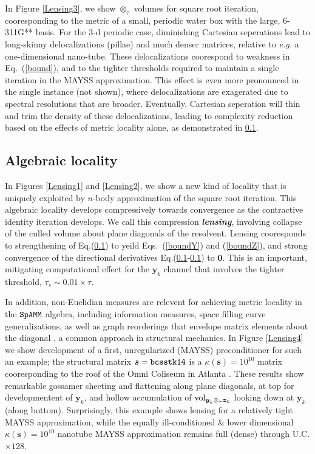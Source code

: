 \documentclass[letterpaper,twocolumn,amsmath,amsfont,amssymb,english,aps,jcp,preprintnumbers,groupaddress,nofootinbib,tightenlines,floatfix]{revtex4}
\newcommand{\mat}[1]{\boldsymbol{#1}}
\newcommand{\ot}{  {\scriptstyle \otimes}_{ \tau } }
\theoremstyle{plain}
\theoremstyle{remark}
\theoremstyle{plain}
\begin{document}
In Figure \ref{Lensing3}, we show $\ot$ volumes for square root iteration, cooresponding to the metric of a small, periodic water box 
with the large, 6-311G** basis.  For the 3-d periodic case, diminishing Cartesian seperations lead to long-skinny delocalizations (pillae)
and much denser matrices, relative to {\em e.g.} a one-dimensional nano-tube.  These delocalizations coorespond to weakness in Eq.~(\ref{bound}),  
and to the tighter thresholds required to maintain a single iteration in the MAYSS approximation.  This effect is even more pronounced in the 
single instance (not shown), where delocalizations are exagerated due to spectral resolutions that are broader.  
Eventually, Cartesian seperation will thin and trim the density of these delocalizations,  
leading to complexity reduction based on the effects of metric locality alone, as demonstrated in \ref{}.

\subsection{Algebraic locality}

In Figures \ref{Lensing1} and \ref{Lensing2},  we show a new kind of locality that is uniquely exploited by $n$-body approximation 
of the square root iteration.  This {algebraic locality} develops compressively towards convergence 
as the contractive identity iteration develops.  
We call this compression {\bf  \em lensing},  involving collapse  of the culled volume about plane diagonals of the resolvent.
Lensing cooresponds to strengthening of Eq.(\ref{}) to yeild Eqs.~(\ref{boundY}) and (\ref{boundZ}), and strong convergence of the
directional derivatives Eq.(\ref{}-\ref{}) to $\mat{0}$.
This is an important, mitigating computational effect for the $\mat{y}_k$ channel that involves the 
tighter threshold, $\tau_s \sim 0.01 \times \tau$. 

In addition, non-Euclidian measures are relevent for achieving metric locality in 
the $\tt SpAMM$ algebra, including information measures, space filling curve generalizations, as well 
as graph reorderings that envelope matrix elements about the diagonal \cite{}, a common approach in 
structural mechanics.   In Figure \ref{Lensing4} we show development of a first, unregularized (MAYSS) 
preconditioner for such an example; the structural matrix $\mat{s}={\tt bcsstk14}$ is a $\kappa(\mat{s})=10^{10}$ matrix 
cooresponding to the roof of the Omni Coliseum in Atlanta \cite{}.  These results show remarkable 
gossamer sheeting and flattening along plane diagonals, at top for developmentent of $\mat{y}_k$, 
and hollow accumulation of ${\rm vol}_{\mat{y}_k \ot \mat{z}_k}$ looking down at $\mat{y}_k$ (along bottom).
Surprisingly, this example shows lensing for a relatively tight MAYSS approximation, while the 
equally ill-conditioned \& lower dimensional  $\kappa (\mat{s})=10^{10}$ nanotube MAYSS approximation remains full (dense) 
through U.C. $\times 128$.
\end{document}
